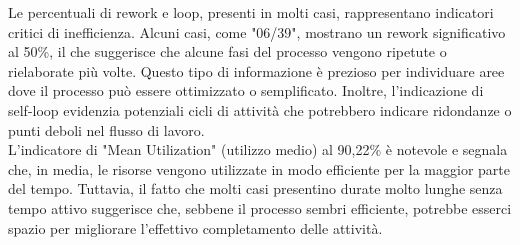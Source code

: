 \documentclass{article}
\begin{document}
Le percentuali di rework e loop, presenti in molti casi, rappresentano indicatori critici di inefficienza. Alcuni casi, come "06/39", mostrano un rework significativo al 50\%, il che suggerisce che alcune fasi del processo vengono ripetute o rielaborate più volte. Questo tipo di informazione è prezioso per individuare aree dove il processo può essere ottimizzato o semplificato. Inoltre, l'indicazione di self-loop evidenzia potenziali cicli di attività che potrebbero indicare ridondanze o punti deboli nel flusso di lavoro.\\
L'indicatore di "Mean Utilization" (utilizzo medio) al 90,22\% è notevole e segnala che, in media, le risorse vengono utilizzate in modo efficiente per la maggior parte del tempo. Tuttavia, il fatto che molti casi presentino durate molto lunghe senza tempo attivo suggerisce che, sebbene il processo sembri efficiente, potrebbe esserci spazio per migliorare l'effettivo completamento delle attività.\\
\end{document}
